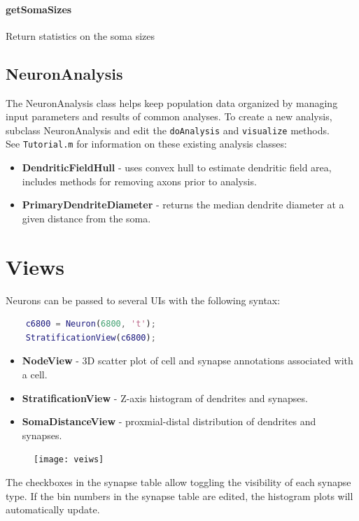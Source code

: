 \documentclass[12pt]{exam}
\begin{document}
	\paragraph{getSomaSizes} Return statistics on the soma sizes
	
	\subsection{NeuronAnalysis}
	The NeuronAnalysis class helps keep population data organized by managing input parameters and results of common analyses. To create a new analysis, subclass NeuronAnalysis and edit the \texttt{doAnalysis} and \texttt{visualize} methods.\\
	See \texttt{Tutorial.m} for information on these existing analysis classes:
	\begin{itemize}
		\item \textbf{DendriticFieldHull} - uses convex hull to estimate dendritic field area, includes methods for removing axons prior to analysis.
		\item \textbf{PrimaryDendriteDiameter} - returns the median dendrite diameter at a given distance from the soma.
	\end{itemize}
	\section{Views}
	Neurons can be passed to several UIs with the following syntax:
	\begin{lstlisting}[language=matlab]
	% VIEWNAME(NeuronObject);
	c6800 = Neuron(6800, 't');
	StratificationView(c6800);\end{lstlisting}
	\begin{itemize}
		\item \textbf{NodeView} - 3D scatter plot of cell and synapse annotations associated with a cell.
		\item \textbf{StratificationView} - Z-axis histogram of dendrites and synapses.
		\item \textbf{SomaDistanceView} - proxmial-distal distribution of dendrites and synapses.
	\end{itemize}
	\begin{figure}[h]
		\texttt{[image: veiws]}
	\end{figure}
	The checkboxes in the synapse table allow toggling the visibility of each synapse type. If the bin numbers in the synapse table are edited, the histogram plots will automatically update.
\end{document}
